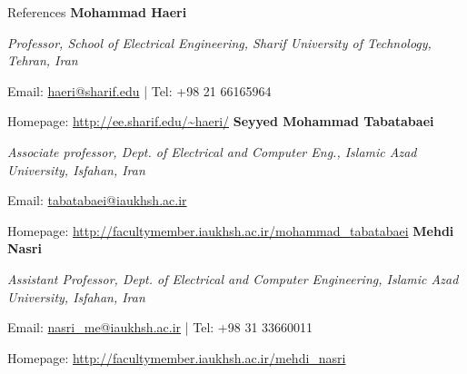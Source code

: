 \begin{rubric}{References}
\entry*%
\textbf{Mohammad Haeri}
\par \emph{Professor, School of Electrical Engineering, Sharif University of Technology, Tehran, Iran}   
\par Email: \url{haeri@sharif.edu} | Tel: +98 21 66165964 
\par Homepage: \url{http://ee.sharif.edu/~haeri/} 
\entry*%
\textbf{Seyyed Mohammad Tabatabaei} 
\par \emph{Associate professor, Dept. of Electrical and Computer Eng., Islamic Azad University, Isfahan, Iran} 
\par Email: \url{tabatabaei@iaukhsh.ac.ir}
\par Homepage: \url{http://facultymember.iaukhsh.ac.ir/mohammad\_tabatabaei} 
\entry*%
\textbf{Mehdi Nasri} 
\par \emph{Assistant Professor, Dept. of Electrical and Computer Engineering, Islamic Azad University, Isfahan, Iran} 
\par Email: \url{nasri_me@iaukhsh.ac.ir} | Tel: +98 31 33660011 
\par Homepage: \url{http://facultymember.iaukhsh.ac.ir/mehdi_nasri}
\end{rubric}
